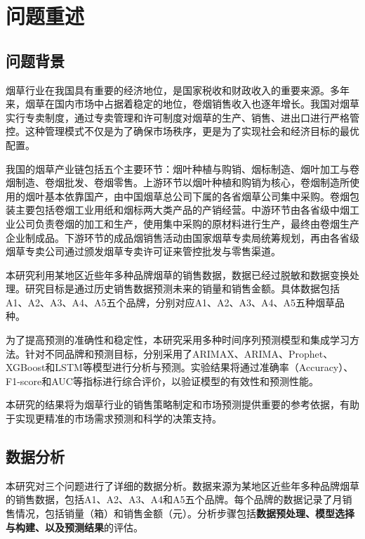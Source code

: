 \documentclass[a4paper]{article}
\begin{document}
	\tableofcontents  
	\newpage 
	
	\pagestyle{mainmatter}
	\setcounter{page}{1}
	\section{问题重述}
	\subsection{问题背景}
	
		烟草行业在我国具有重要的经济地位，是国家税收和财政收入的重要来源。多年来，烟草在国内市场中占据着稳定的地位，卷烟销售收入也逐年增长。我国对烟草实行专卖制度，通过专卖管理和许可制度对烟草的生产、销售、进出口进行严格管控。这种管理模式不仅是为了确保市场秩序，更是为了实现社会和经济目标的最优配置。

		我国的烟草产业链包括五个主要环节：烟叶种植与购销、烟标制造、烟叶加工与卷烟制造、卷烟批发、卷烟零售。上游环节以烟叶种植和购销为核心，卷烟制造所使用的烟叶基本依靠国产，由中国烟草总公司下属的各省烟草公司集中采购。卷烟包装主要包括卷烟工业用纸和烟标两大类产品的产销经营。中游环节由各省级中烟工业公司负责卷烟的加工和生产，使用集中采购的原材料进行生产，最终由卷烟生产企业制成品。下游环节的成品烟销售活动由国家烟草专卖局统筹规划，再由各省级烟草专卖公司通过颁发烟草专卖许可证来管控批发与零售渠道。

		本研究利用某地区近些年多种品牌烟草的销售数据，数据已经过脱敏和数据变换处理。研究目标是通过历史销售数据预测未来的销量和销售金额。具体数据包括A1、A2、A3、A4、A5五个品牌，分别对应A1、A2、A3、A4、A5五种烟草品种。

		为了提高预测的准确性和稳定性，本研究采用多种时间序列预测模型和集成学习方法。针对不同品牌和预测目标，分别采用了ARIMAX、ARIMA、Prophet、XGBoost和LSTM等模型进行分析与预测。实验结果将通过准确率（Accuracy）、F1-score和AUC等指标进行综合评价，以验证模型的有效性和预测性能。

		本研究的结果将为烟草行业的销售策略制定和市场预测提供重要的参考依据，有助于实现更精准的市场需求预测和科学的决策支持。

	\subsection{数据分析}

	本研究对三个问题进行了详细的数据分析。数据来源为某地区近些年多种品牌烟草的销售数据，包括A1、A2、A3、A4和A5五个品牌。每个品牌的数据记录了月销售情况，包括销量（箱）和销售金额（元）。分析步骤包括\textbf{数据预处理、模型选择与构建、以及预测结果}的评估。
	
\end{document}
